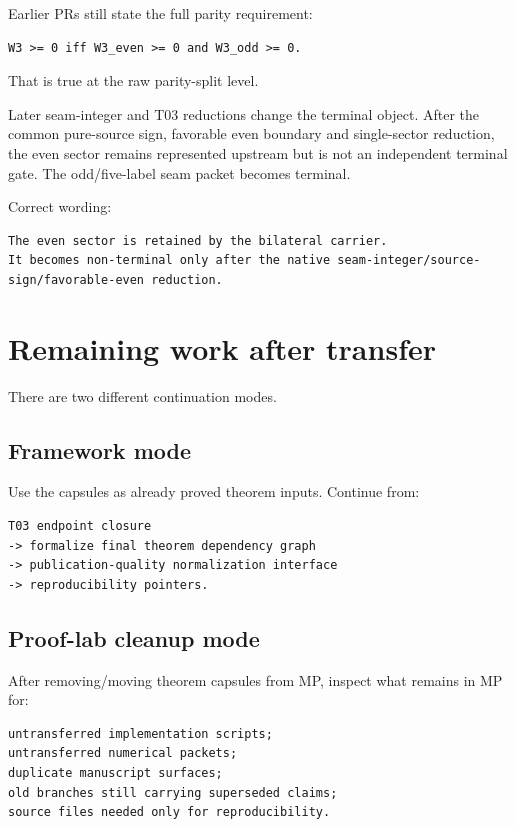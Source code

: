Earlier PRs still state the full parity requirement:

\begin{verbatim}
W3 >= 0 iff W3_even >= 0 and W3_odd >= 0.
\end{verbatim}

That is true at the raw parity-split level.

Later seam-integer and T03 reductions change the terminal object. After the common pure-source sign, favorable even boundary and single-sector reduction, the even sector remains represented upstream but is not an independent terminal gate. The odd/five-label seam packet becomes terminal.

Correct wording:

\begin{verbatim}
The even sector is retained by the bilateral carrier.
It becomes non-terminal only after the native seam-integer/source-sign/favorable-even reduction.
\end{verbatim}

\hypertarget{remaining-work-after-transfer}{%
\section{Remaining work after transfer}\label{remaining-work-after-transfer}}

There are two different continuation modes.

\hypertarget{framework-mode}{%
\subsection{Framework mode}\label{framework-mode}}

Use the capsules as already proved theorem inputs. Continue from:

\begin{verbatim}
T03 endpoint closure
-> formalize final theorem dependency graph
-> publication-quality normalization interface
-> reproducibility pointers.
\end{verbatim}

\hypertarget{proof-lab-cleanup-mode}{%
\subsection{Proof-lab cleanup mode}\label{proof-lab-cleanup-mode}}

After removing/moving theorem capsules from MP, inspect what remains in MP for:

\begin{verbatim}
untransferred implementation scripts;
untransferred numerical packets;
duplicate manuscript surfaces;
old branches still carrying superseded claims;
source files needed only for reproducibility.
\end{verbatim}

